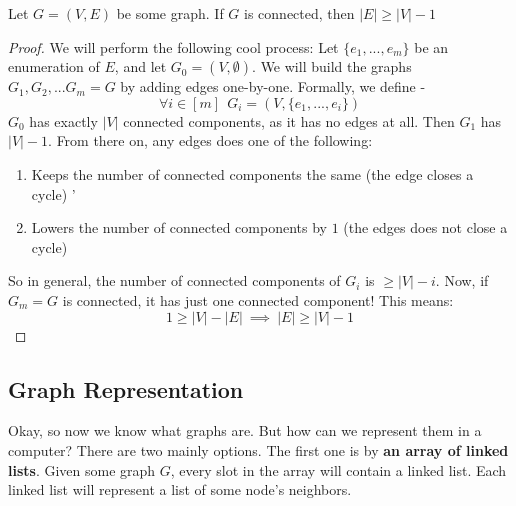 \begin{prop}
Let $G=(V,E)$ be some graph. If $G$ is connected, then $|E| \geq |V|-1$
\end{prop}

\begin{proof}
We will perform the following cool process: Let $\{e_1,...,e_m\}$ be an enumeration of $E$, and let $G_0=(V,\emptyset)$. We will build the graphs $G_1, G_2,... G_m=G$ by adding edges one-by-one. Formally, we define - 
$$\forall i\in[m]\ \ G_i=(V,\{e_1,...,e_i\})$$
$G_0$ has exactly $|V|$ connected components, as it has no edges at all. Then $G_1$ has $|V|-1$. From there on, any edges does one of the following:
\begin{enumerate}
    \item Keeps the number of connected components the same (the edge closes a cycle)
    '\item Lowers the number of connected components by $1$ (the edges does not close a cycle)
\end{enumerate}

So in general, the number of connected components of $G_i$ is $\geq |V|-i$. 
Now, if $G_m=G$ is connected, it has just one connected component! This means:
$$1 \geq |V| - |E|\ \implies \ |E|\geq|V|-1$$

\end{proof}


\subsection{Graph Representation}

Okay, so now we know what graphs are. But how can we represent them in a computer? There are two mainly options. The first one is by \textbf{an array of linked lists}. Given some graph $G$, every slot in the array will contain a linked list. Each linked list will represent a list of some node's neighbors.\\

